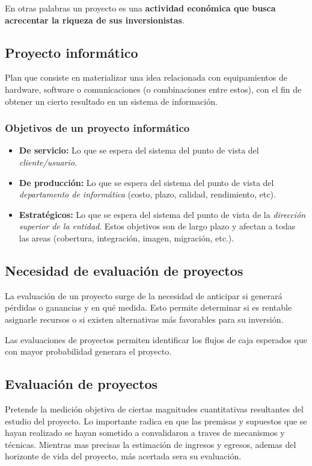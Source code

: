 \documentclass{templateNote}
\begin{document}
En otras palabras un proyecto es una \textbf{actividad económica que busca acrecentar la riqueza de sus inversionistas}.

\subsection*{Proyecto informático}
Plan que consiste en materializar una idea relacionada con equipamientos de hardware, software o comunicaciones (o combinaciones entre estos), con el fin de obtener un cierto resultado en un sistema de información.

\subsubsection*{Objetivos de un proyecto informático}
\begin{itemize}
    \item \textbf{De servicio:} Lo que se espera del sistema del punto de vista del \textit{cliente/usuario}.
    \item \textbf{De producción:} Lo que se espera del sistema del punto de vista del \textit{departamento de informática} (costo, plazo, calidad, rendimiento, etc).
    \item \textbf{Estratégicos:} Lo que se espera del sistema del punto de vista de la \textit{dirección superior de la entidad}. Estos objetivos son de largo plazo y afectan a todas las areas (cobertura, integración, imagen, migración, etc.).
\end{itemize}

\subsection*{Necesidad de evaluación de proyectos}
La evaluación de un proyecto surge de la necesidad de anticipar si generará pérdidas o ganancias y en qué medida. Esto permite determinar si es rentable asignarle recursos o si existen alternativas más favorables para su inversión.

Las evaluaciones de proyectos permiten identificar los flujos de caja esperados que con mayor probabilidad generara el proyecto.

\subsection*{Evaluación de proyectos}
Pretende la medición objetiva de ciertas magnitudes cuantitativas resultantes del estudio del proyecto. Lo importante radica en que las premisas y supuestos que se hayan realizado se hayan sometido a convalidaron a traves de mecanismos y técnicas. Mientras mas precisas la estimación de ingresos y egresos, ademas del horizonte de vida del proyecto, más acertada sera su evaluación.
\end{document}
